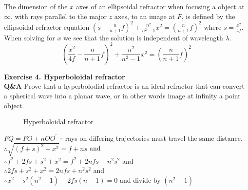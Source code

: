 \documentclass[main.tex]{subfiles}
\begin{document}
The dimension of the $x$ axes of an ellipsoidal refractor when focusing a object at $\infty$, with rays parallel to the major $z$ axes, to an image at $F$, is defined by the ellipsoidal refractor equation $\left(s-\frac{n}{n+1}f \right)^2 + \frac{n^2}{n^2 - 1}x^2 = \left(\frac{n}{n+1}f \right)^2$ where $s=\frac{x^2}{4f}$. When solving for $x$ we see that the solution is independent of wavelength $\lambda$.\\

\begin{equation}
\left(\frac{x^2}{4f}-\frac{n}{n+1}f \right)^2 + \frac{n^2}{n^2 - 1}x^2 = \left(\frac{n}{n+1}f \right)^2
\end{equation}

\textbf{Exercise 4. Hyperboloidal refractor}\\

\textbf{Q\&A} Prove that a hyperbolodial refractor is an ideal refractor that can convert a spherical wave into a planar wave, or in other words image at infinity a point object.\\

\begin{figure}
\centering{}
\caption{Hyperboloidal refractor}
\label{fig:4}
\end{figure}

$FQ = FO + nOO^{\prime}$ $\because$ rays on differing trajectories must travel the same distance.\\

$\therefore \sqrt{(f+s)^2 + x^2} = f + ns$  and\\ 

$\therefore  f^2+ 2fs + s^2 + x^2 = f^2 + 2nfs + n^2s^2$  and\\ 

$\therefore 2fs + s^2 + x^2 = 2nfs + n^2s^2$  and\\ 

$\therefore x^2  - s^2(n^2 - 1) - 2fs(n- 1) = 0$  and divide by $(n^2 - 1)$ \\ 
\end{document}
